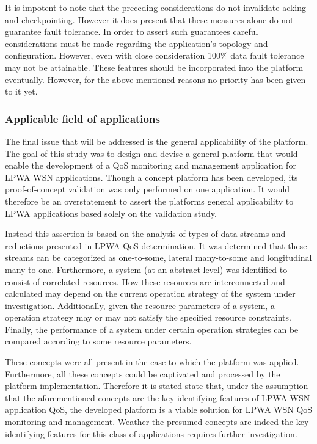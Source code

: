 It is impotent to note that the preceding considerations do not invalidate acking and checkpointing. However it does present that these measures alone do not guarantee fault tolerance. In order to assert such guarantees careful considerations must be made regarding the application's topology and configuration. However, even with close consideration 100\% data fault tolerance may not be attainable. These features should be incorporated into the platform eventually. However, for the above-mentioned reasons no priority has been given to it yet.

\subsubsection{Applicable field of applications}
The final issue that will be addressed is the general applicability of the platform. The goal of this study was to design and devise a general platform that would enable the development of a QoS monitoring and management application for LPWA WSN applications. Though a concept platform has been developed, its proof-of-concept validation was only performed on one application. It would therefore be an overstatement to assert the platforms general applicability to LPWA applications based solely on the validation study.

Instead this assertion is based on the analysis of types of data streams and reductions presented in LPWA QoS determination. It was determined that these streams can be categorized as one-to-some, lateral many-to-some and longitudinal many-to-one. Furthermore, a system (at an abstract level) was identified to consist of correlated resources. How these resources are interconnected and calculated may depend on the current operation strategy of the system under investigation. Additionally, given the resource parameters of a system, a operation strategy may or may not satisfy the specified resource constraints. Finally, the performance of a system under certain operation strategies can be compared according to some resource parameters.

These concepts were all present in the case to which the platform was applied. Furthermore, all these concepts could be captivated and processed by the platform implementation. Therefore it is stated state that, under the assumption that the aforementioned concepts are the key identifying features of LPWA WSN application QoS, the developed platform is a viable solution for LPWA WSN QoS monitoring and management. Weather the presumed concepts are indeed the key identifying features for this class of applications requires further investigation. 

